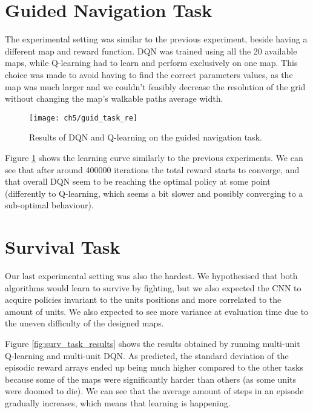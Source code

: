 \section{Guided Navigation Task}

The experimental setting was similar to the previous experiment, beside having a
different map and reward function. DQN was trained using all the 20 available
maps, while Q-learning had to learn and perform exclusively on one map. This
choice was made to avoid having to find the correct parameters values, as the
map was much larger and we couldn't feasibly decrease the resolution of the grid
without changing the map's walkable paths average width.

\begin{figure}[h]
    \centering
    \texttt{[image: ch5/guid\_task\_re]}
    \caption{Results of DQN and Q-learning on the guided navigation task.}
    \label{fig:guid_task_results}
\end{figure}

Figure \ref{fig:guid_task_results} shows the learning curve similarly to the
previous experiments. We can see that after around 400000 iterations the total
reward starts to converge, and that overall DQN seem to be reaching the optimal
policy at some point (differently to Q-learning, which seems a bit slower and
possibly converging to a sub-optimal behaviour).

\section{Survival Task}

Our last experimental setting was also the hardest. We hypothesised that both
algorithms would learn to survive by fighting, but we also expected the CNN to
acquire policies invariant to the units positions and more correlated to the
amount of units. We also expected to see more variance at evaluation time due to
the uneven difficulty of the designed maps.


Figure \ref{fig:surv_task_results} shows the results obtained by running
multi-unit Q-learning and multi-unit DQN. As predicted, the standard deviation
of the episodic reward arrays ended up being much higher compared to the other
tasks because some of the maps were significantly harder than others (as some
units were doomed to die). We can see that the average amount of steps in an
episode gradually increases, which means that learning is happening.

